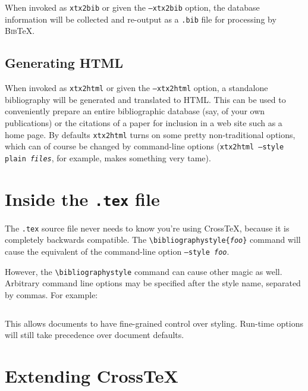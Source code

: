 \documentclass{article}
\newcommand{\XTeX}{Cross\TeX}
\newcommand{\BibTeX}{\textsc{Bib}\TeX}
\begin{document}
When invoked as \texttt{xtx2bib} or given the \texttt{--xtx2bib} option, the database information will be collected and re-output as a \texttt{.bib} file for processing by \BibTeX{}.


\subsection{Generating HTML}

When invoked as \texttt{xtx2html} or given the \texttt{--xtx2html} option, a standalone bibliography will be generated and translated to HTML. This can be used to conveniently prepare an entire bibliographic database (say, of your own publications) or the citations of a paper for inclusion in a web site such as a home page. By defaults \texttt{xtx2html} turns on some pretty non-traditional options, which can of course be changed by command-line options (\texttt{xtx2html --style plain \textrm{\textit{files}}}, for example, makes something very tame).



\section{Inside the \texttt{.tex} file}

The \texttt{.tex} source file never needs to know you're using \XTeX{}, because it is completely backwards compatible. The \texttt{\textbackslash{}bibliographystyle\{\textrm{\textit{foo}}\}} command will cause the equivalent of the command-line option \texttt{--style \textrm{\textit{foo}}}.

However, the \texttt{\textbackslash{}bibliographystyle} command can cause other magic as well. Arbitrary command line options may be specified after the style name, separated by commas. For example:

\begin{small}\begin{verbatim}

\end{verbatim}\end{small}

This allows documents to have fine-grained control over styling. Run-time options will still take precedence over document defaults.



\section{Extending \XTeX{}}
\label{extending}
\end{document}
